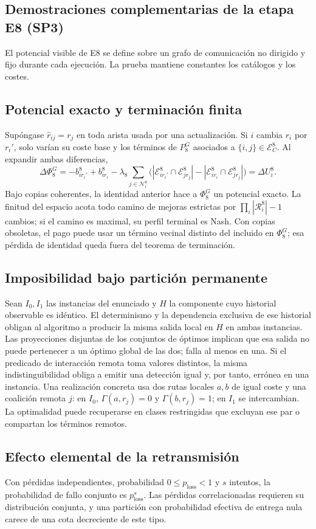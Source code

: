 \subsection{Demostraciones complementarias de la etapa E8 (SP3)}
\label{app:sp8-proofs}

El potencial visible de E8 se define sobre un grafo de comunicación no dirigido y fijo durante cada ejecución. La prueba mantiene constantes los catálogos y los costes.

\subsection{Potencial exacto y terminación finita}

Supóngase $\widehat r_{ij}=r_j$ en toda arista usada por una actualización. Si $i$ cambia $r_i$ por $r_i'$, solo varían su coste base y los términos de $P_8^G$ asociados a $\{i,j\}\in\mathcal E_C^8$. Al expandir ambas diferencias,
\[
 \Delta\Phi_8^G=-b_{ir_i'}^8+b_{ir_i}^8
 -\lambda_8\sum_{j\in\mathcal N_i^8}
 \bigl(|\mathcal E_{ir_i'}^8\cap\mathcal E_{jr_j}^8|-|\mathcal E_{ir_i}^8\cap\mathcal E_{jr_j}^8|\bigr)=\Delta U_i^8.
\]
Bajo copias coherentes, la identidad anterior hace a \(\Phi_8^G\) un potencial exacto. La finitud del espacio acota todo camino de mejoras estrictas por \(\prod_i|\mathcal R_i^8|-1\) cambios; si el camino es maximal, su perfil terminal es Nash. Con copias obsoletas, el pago puede usar un término vecinal distinto del incluido en \(\Phi_8^G\); esa pérdida de identidad queda fuera del teorema de terminación.

\subsection{Imposibilidad bajo partición permanente}

Sean $I_0,I_1$ las instancias del enunciado y $H$ la componente cuyo historial observable es idéntico. El determinismo y la dependencia exclusiva de ese historial obligan al algoritmo a producir la misma salida local en $H$ en ambas instancias. Las proyecciones disjuntas de los conjuntos de óptimos implican que esa salida no puede pertenecer a un óptimo global de las dos; falla al menos en una. Si el predicado de interacción remota toma valores distintos, la misma indistinguibilidad obliga a emitir una detección igual y, por tanto, errónea en una instancia. Una realización concreta usa dos rutas locales $a,b$ de igual coste y una coalición remota $j$: en $I_0$, $\Gamma(a,r_j)=0$ y $\Gamma(b,r_j)=1$; en $I_1$ se intercambian. La optimalidad puede recuperarse en clases restringidas que excluyan ese par o compartan los términos remotos.

\subsection{Efecto elemental de la retransmisión}

Con pérdidas independientes, probabilidad \(0\leq p_{\mathrm{loss}}<1\) y \(s\) intentos, la probabilidad de fallo conjunto es \(p_{\mathrm{loss}}^s\). Las pérdidas correlacionadas requieren su distribución conjunta, y una partición con probabilidad efectiva de entrega nula carece de una cota decreciente de este tipo.
